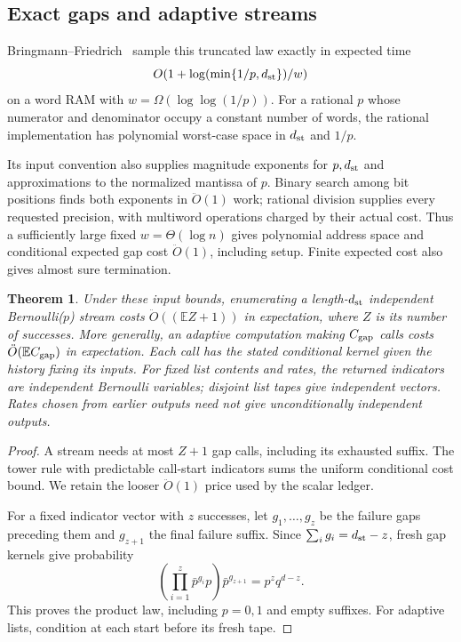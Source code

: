 \documentclass[11pt]{article}
\newtheorem{theorem}{Theorem}[section]
\theoremstyle{remark}
\newcommand{\Ex}{\mathbb E}
\renewcommand{\O}{\ddot{O}}
\begin{document}
\subsection{Exact gaps and adaptive streams}

Bringmann--Friedrich~\cite[Theorem~5]{BF13:conf} sample this truncated law
exactly in expected time
\[
 O(1+\log(\min\{1/p,d_{\rm st}\})/w)
\]
on a word RAM with $w=\Omega(\log\log(1/p))$.
For a rational $p$ whose numerator and denominator occupy a constant number of
words, the rational implementation has polynomial worst-case space in $d_{\rm st}$ and
$1/p$.

Its input convention also supplies magnitude exponents for $p,d_{\rm st}$ and
approximations to the normalized mantissa of $p$.
Binary search among bit positions finds both exponents in $\O(1)$ work; rational
division supplies every requested precision, with multiword operations charged
by their actual cost.
Thus a sufficiently large fixed $w=\Theta(\log n)$ gives polynomial address space and
conditional expected gap cost $\O(1)$, including setup.
Finite expected cost also gives almost sure termination.

\begin{theorem}
\label{thm:ram-exact-streams}
Under these input bounds, enumerating a length-$d_{\rm st}$ independent Bernoulli($p$)
stream costs $\O((\Ex Z+1))$ in expectation, where $Z$ is its number of
successes.
More generally, an adaptive computation making $C_{\rm gap}$ calls costs $\O(\Ex
C_{\rm gap})$ in expectation.
Each call has the stated conditional kernel given the history fixing its inputs.
For fixed list contents and rates, the returned indicators are independent
Bernoulli variables; disjoint list tapes give independent vectors.
Rates chosen from earlier outputs need not give unconditionally independent
outputs.
\end{theorem} \begin{proof} A stream needs at most $Z+1$ gap calls, including
its exhausted suffix.
The tower rule with predictable call-start indicators sums the uniform
conditional cost bound.
We retain the looser $\O(1)$ price used by the scalar ledger.

For a fixed indicator vector with $z$ successes, let $g_1,\ldots,g_z$ be the
failure gaps preceding them and $g_{z+1}$ the final failure suffix.
Since $\sum_i g_i=d_{\rm st}-z$, fresh gap kernels give probability
\[
 \left(\prod_{i=1}^{z}\bar p^{g_i}p\right)\bar p^{g_{z+1}}
       =p^zq^{d-z}.
\]
This proves the product law, including $p=0,1$ and empty suffixes.
For adaptive lists, condition at each start before its fresh tape.
\end{proof}
\end{document}
